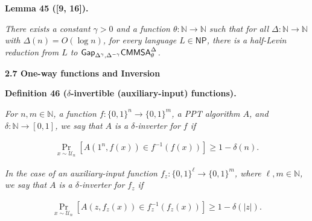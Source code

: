 \documentclass[10pt,a4paper]{article}
\begin{document}




\par\medskip\noindent\textbf{
\textbf{Lemma 45}\textbf{ }([9, 16])\textbf{.}
}\par



\emph{There exists a constant $\gamma>0$ and a function $\theta:\mathbb{N}\to\mathbb{N}$ such that for all $\Delta:\mathbb{N}\to\mathbb{N}$ with $\Delta(n)=O(\log n)$, for every language $L\in{\mathsf{NP}}$, there is a half-Levin reduction from $L$ to ${\sf Gap}_{\Delta^{\gamma},\Delta^{-\gamma}}{\mathsf{CMMSA}}^{\Delta}_{\theta}$.}\par







\par\medskip\noindent\textbf{
2.7 One-way functions and Inversion}\par





\par\medskip\noindent\textbf{
\textbf{Definition 46}\textbf{ }($\delta$-invertible (auxiliary-input) functions)\textbf{.}
}\par



\emph{For $n,m\in\mathbb{N}$, a function $f:\{0,1\}^{n}\to\{0,1\}^{m}$, a PPT algorithm $A$, and $\delta:\mathbb{N}\to[0,1]$, we say that $A$ is a $\delta$-inverter for $f$ if}\par


\[\begin{gathered}
\Pr_{x\sim\mathcal{U}_{n}}[A(1^{n},f(x))\in f^{-1}(f(x))]\geq 1-\delta(n).
\end{gathered}\]




\emph{In the case of an auxiliary-input function $f_{z}:\{0,1\}^{\ell}\to\{0,1\}^{m}$, where $\ell,m\in\mathbb{N}$, we say that $A$ is a $\delta$-inverter for $f_{z}$ if}\par


\[\begin{gathered}
\Pr_{x\sim\mathcal{U}_{n}}[A(z,f_{z}(x))\in f_{z}^{-1}(f_{z}(x))]\geq 1-\delta(|z|).
\end{gathered}\]
\end{document}
